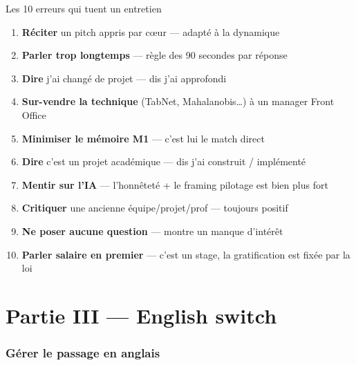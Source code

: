 \documentclass[11pt,a4paper]{article}
\begin{document}
\begin{dangerbox}{Les 10 erreurs qui tuent un entretien}
\begin{enumerate}[nosep, leftmargin=16pt]
\item \textbf{R\'eciter} un pitch appris par c\oe{}ur --- adapt\'e \`a la dynamique
\item \textbf{Parler trop longtemps} --- r\`egle des 90 secondes par r\'eponse
\item \textbf{Dire} \og j'ai chang\'e de projet \fg{} --- dis \og j'ai approfondi \fg{}
\item \textbf{Sur-vendre la technique} (TabNet, Mahalanobis\ldots) \`a un manager Front Office
\item \textbf{Minimiser le m\'emoire M1} --- c'est lui le match direct
\item \textbf{Dire} \og c'est un projet acad\'emique \fg{} --- dis \og j'ai construit / impl\'ement\'e \fg{}
\item \textbf{Mentir sur l'IA} --- l'honn\^etet\'e + le framing \og pilotage \fg{} est bien plus fort
\item \textbf{Critiquer} une ancienne \'equipe/projet/prof --- toujours positif
\item \textbf{Ne poser aucune question} --- montre un manque d'int\'er\^et
\item \textbf{Parler salaire en premier} --- c'est un stage, la gratification est fix\'ee par la loi
\end{enumerate}
\end{dangerbox}

\vspace{10pt}

%
%

\newpage
\part*{Partie III --- English switch}

\section{G\'erer le passage en anglais}
\end{document}
